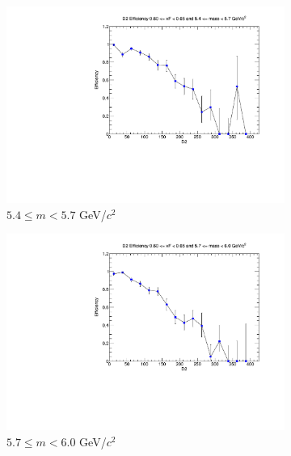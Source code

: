 \begin{figure}[p]
\begin{subfigure}[b]{0.32\textwidth}
        \includegraphics[width=\textwidth]{./kTrackerEfficiencyPlots/D2_Efficiency_xF12_mass4.pdf}
        \caption{$5.4 \leq m < 5.7$ GeV/$c^2$}
        \label{fig:xF12_mass4}
    \end{subfigure}
    \hfill
    \begin{subfigure}[b]{0.32\textwidth}
        \centering
        \includegraphics[width=\textwidth]{./kTrackerEfficiencyPlots/D2_Efficiency_xF12_mass5.pdf}
        \caption{$5.7 \leq m < 6.0$ GeV/$c^2$}
        \label{fig:xF12_mass5}
    \end{subfigure}
    \vspace{0.5cm}
    \begin{subfigure}[b]{0.32\textwidth}
        \centering

\end{subfigure}
\end{figure}
